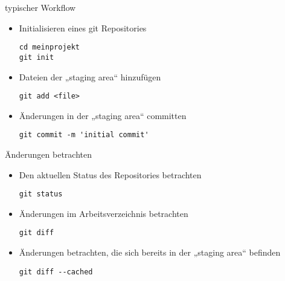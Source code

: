 \begin{frame}[fragile]{typischer Workflow}
  \begin{itemize}
    \item Initialisieren eines git Repositories
    \begin{lstlisting}
cd meinprojekt
git init
    \end{lstlisting}
    \item Dateien der „staging area“ hinzufügen
    \begin{lstlisting}
git add <file>
    \end{lstlisting}
    \item Änderungen in der „staging area“ committen
    \begin{lstlisting}
git commit -m 'initial commit'
    \end{lstlisting}
    \end{itemize}
\end{frame}

\begin{frame}[fragile]{Änderungen betrachten}
  \begin{itemize}
    \item Den aktuellen Status des Repositories betrachten
    \begin{lstlisting}
git status
    \end{lstlisting}
    \item Änderungen im Arbeitsverzeichnis betrachten
    \begin{lstlisting}
git diff
    \end{lstlisting}
    \item Änderungen betrachten, die sich bereits in der „staging area“ befinden
    \begin{lstlisting}
git diff --cached
    \end{lstlisting}
  \end{itemize}
\end{frame}

